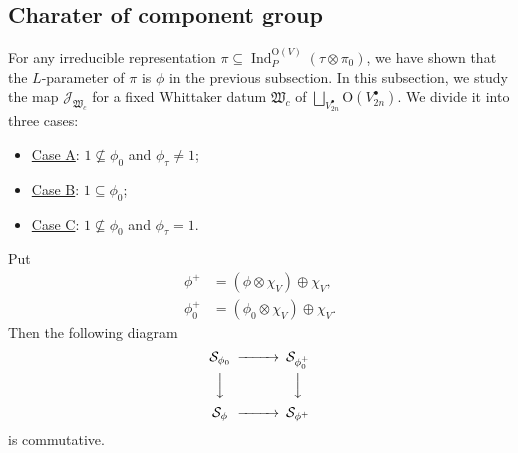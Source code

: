 \documentclass[article]{article}
\numberwithin{equation}{section}
\theoremstyle{definition}
\DeclareMathOperator{\Ind}{Ind}
\begin{document}
\subsection{Charater of component group}
For any irreducible representation $\pi\subseteq \Ind_{P}^{\mathrm O(V)}(\tau\otimes \pi_0)$, we have shown that the $L$-parameter of $\pi$ is $\phi$ in the previous subsection. In this subsection, we study the map $\mathcal J_{\mathfrak W_{c}}$ for a fixed Whittaker datum $\mathfrak W_{c}$ of $\bigsqcup_{V_{2n}^{\bullet}}\mathrm O(V_{2n}^\bullet)$. We divide it into three cases: 
\begin{itemize}
	\item  \underline{Case A}: $1\not\subseteq \phi_{0}$ and $\phi_{\tau}\neq \mathrm 1$;
	\item \underline{Case B}: $1\subseteq \phi_{0}$;
	\item \underline{Case C}: $1\not\subseteq \phi_{0}$ and $\phi_{\tau}= \mathrm 1$.
\end{itemize}
Put 
\begin{align*}
\phi^+&=(\phi\otimes \chi_{V})\oplus \chi_{V} ,\\
\phi^+_{0}&=(\phi_{0}\otimes\chi_{V})\oplus \chi_{V}.
\end{align*}
Then the following diagram
\begin{align}\label{101}
\begin{CD}
\mathcal S_{\phi_0} @>>> \mathcal S_{\phi^+_{0}} \\
@VVV @VVV \\
\mathcal {S}_{\phi} @>>> \mathcal S_{\phi^+}
\end{CD}
\end{align}
is commutative. 
\end{document}
